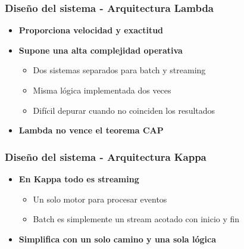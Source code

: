 \documentclass[aspectratio=169]{beamer}
\begin{document}
\begin{frame}
\frametitle{Diseño del sistema - Arquitectura Lambda}
\begin{itemize}
  \item \textbf{Proporciona velocidad y exactitud}

  \vspace{1em}

  \item \textbf{Supone una alta complejidad operativa}
  \begin{itemize}
    \item Dos sistemas separados para batch y streaming
    \item Misma lógica implementada dos veces
    \item Difícil depurar cuando no coinciden los resultados
  \end{itemize}

  \vspace{1em}

  \item \textbf{Lambda no vence el teorema CAP}
\end{itemize}
\end{frame}


\begin{frame}
\frametitle{Diseño del sistema - Arquitectura Kappa}
  \begin{itemize}

    \item \textbf{En Kappa todo es streaming}
    \begin{itemize}
      \item Un solo motor para procesar eventos
      \item Batch es simplemente un stream acotado con inicio y fin
    \end{itemize}

    \vspace{1em}

    \item \textbf{Simplifica con un solo camino y una sola lógica}
  \end{itemize}
\end{frame}
\end{document}
